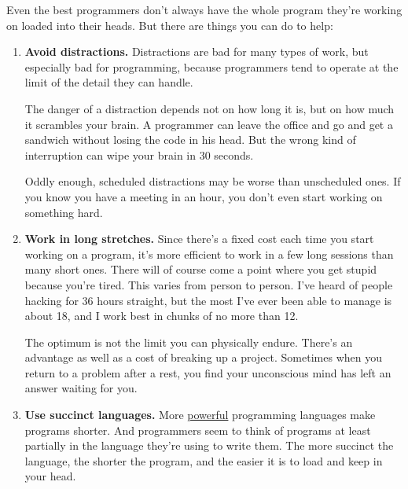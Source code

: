 \documentclass[12pt]{book}
\begin{document}
Even the best programmers don't always have the whole program they're
working on loaded into their heads. But there are things you can do to
help:

\begin{enumerate}
\def\labelenumi{\arabic{enumi}.}
\item
  \textbf{Avoid distractions.} Distractions are bad for many types of
  work, but especially bad for programming, because programmers tend to
  operate at the limit of the detail they can handle.

  The danger of a distraction depends not on how long it is, but on how
  much it scrambles your brain. A programmer can leave the office and go
  and get a sandwich without losing the code in his head. But the wrong
  kind of interruption can wipe your brain in 30 seconds.

  Oddly enough, scheduled distractions may be worse than unscheduled
  ones. If you know you have a meeting in an hour, you don't even start
  working on something hard.
\item
  \textbf{Work in long stretches.} Since there's a fixed cost each time
  you start working on a program, it's more efficient to work in a few
  long sessions than many short ones. There will of course come a point
  where you get stupid because you're tired. This varies from person to
  person. I've heard of people hacking for 36 hours straight, but the
  most I've ever been able to manage is about 18, and I work best in
  chunks of no more than 12.

  The optimum is not the limit you can physically endure. There's an
  advantage as well as a cost of breaking up a project. Sometimes when
  you return to a problem after a rest, you find your unconscious mind
  has left an answer waiting for you.
\item
  \textbf{Use succinct languages.} More \href{power.html}{powerful}
  programming languages make programs shorter. And programmers seem to
  think of programs at least partially in the language they're using to
  write them. The more succinct the language, the shorter the program,
  and the easier it is to load and keep in your head.


\end{enumerate}
\end{document}
